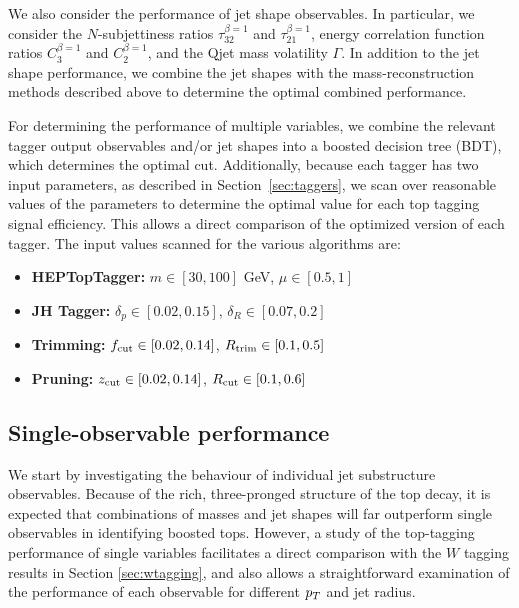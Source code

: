 We also consider the performance of jet shape observables. In particular, we consider the $N$-subjettiness ratios $\tau_{32}^{\beta=1}$ and $\tau_{21}^{\beta=1}$, energy correlation function ratios $C_3^{\beta=1}$ and $C_2^{\beta=1}$, and the Qjet mass volatility $\Gamma$. In addition to the jet shape performance, we combine the jet shapes with the mass-reconstruction methods described above to determine the optimal combined performance.

For determining the performance of multiple variables, we combine the relevant tagger output observables and/or jet shapes into a boosted decision tree (BDT), which determines the optimal cut. Additionally, because each tagger has two input parameters, as described in Section~\ref{sec:taggers}, we scan over reasonable values of the parameters to determine the optimal value for each top tagging signal efficiency. This allows a direct comparison of the optimized version of each tagger. The input values scanned for the various algorithms are:
%
\begin{itemize}
\item {\bf HEPTopTagger:} $m\in[30,100]$ GeV, $\mu\in[0.5,1]$
\item {\bf JH Tagger:} $\delta_p\in[0.02,0.15]$, $\delta_R\in[0.07,0.2]$
\item {\bf Trimming:} $f_{\rm cut}\in[0.02,0.14]$, $R_{\rm trim}\in[0.1,0.5]$
\item {\bf Pruning:} $z_{\rm cut}\in[0.02,0.14]$, $R_{\rm cut}\in[0.1,0.6]$
\end{itemize}

\subsection{Single-observable performance}\label{sec:single_variable}
We start by investigating the behaviour of individual jet substructure observables. Because of the rich, three-pronged structure of the top decay, it is expected that combinations of masses and jet shapes will far outperform single observables in identifying boosted tops. However, a study of the top-tagging performance of single variables facilitates a direct comparison with the $W$ tagging results in Section \ref{sec:wtagging}, and also allows a straightforward examination of the performance of each observable for different $p_T$ and jet radius.

